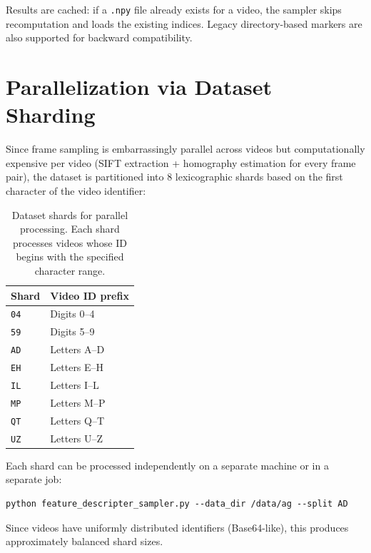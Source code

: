 \documentclass[runningheads]{llncs}
\begin{document}
Results are cached: if a \texttt{.npy} file already exists for a video, the sampler skips recomputation and loads the existing indices.  Legacy directory-based markers are also supported for backward compatibility.


\section{Parallelization via Dataset Sharding}
\label{sec:sharding}

Since frame sampling is embarrassingly parallel across videos but computationally expensive per video (SIFT extraction + homography estimation for every frame pair), the dataset is partitioned into 8 lexicographic shards based on the first character of the video identifier:

\begin{table}[h]
\centering
\caption{Dataset shards for parallel processing.  Each shard processes videos whose ID begins with the specified character range.}
\label{tab:shards}
\small
\begin{tabular}{@{}ll@{}}
\toprule
\textbf{Shard} & \textbf{Video ID prefix} \\
\midrule
\texttt{04} & Digits 0--4 \\
\texttt{59} & Digits 5--9 \\
\texttt{AD} & Letters A--D \\
\texttt{EH} & Letters E--H \\
\texttt{IL} & Letters I--L \\
\texttt{MP} & Letters M--P \\
\texttt{QT} & Letters Q--T \\
\texttt{UZ} & Letters U--Z \\
\bottomrule
\end{tabular}
\end{table}

Each shard can be processed independently on a separate machine or in a separate job:
\begin{verbatim}
python feature_descripter_sampler.py --data_dir /data/ag --split AD
\end{verbatim}
Since videos have uniformly distributed identifiers (Base64-like), this produces approximately balanced shard sizes.


\end{document}
